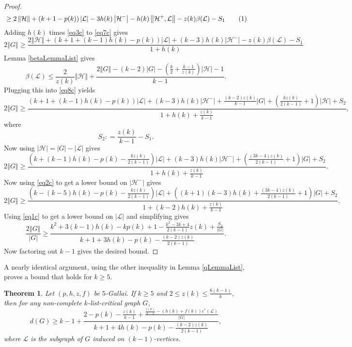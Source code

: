 \documentclass[10pt]{article}
\theoremstyle{plain}
\newtheorem{thm}{Theorem}[section]
\theoremstyle{definition}
\theoremstyle{remark}
\newcommand{\fancy}[1]{\mathcal{#1}}
\renewcommand{\L}{\fancy{L}}
\newcommand{\HH}{\fancy{H}}
\newcommand{\card}[1]{\left|#1\right|}
\newcommand{\size}[1]{\left\Vert#1\right\Vert}
\newcommand{\parens}[1]{\left( #1 \right)}
\newcommand{\DefinedAs}{\mathrel{\mathop:}=}
\newcommand\numberthis{\addtocounter{equation}{1}\tag{\theequation}}
\begin{document}
\begin{proof}
\begin{align*}
	&\ge 2\size{\HH} + \parens{k+1 - p(k)}\card{\L} - 3h(k)\card{\HH^-} - h(k)\size{\HH^+, \L} - z(k)\beta(\L) - S_1\numberthis \label{eq7c}\\
\end{align*}
Adding $h(k)$ times \eqref{eq3c} to \eqref{eq7c} gives
\begin{equation}\label{eq8c}
2\size{G} \ge \frac{2\size{\HH} + \parens{k+1 +(k-1)h(k)- p(k)}\card{\L} + (k- 3)h(k)\card{\HH^-}  - z(k)\beta(\L) - S_1}{1 + h(k)}
\end{equation}
Lemma \ref{betaLemmaList} gives
\[\beta(\L) \le \frac{2}{z(k)}\size{\HH} + \frac{2\size{G} - (k-2)\card{G} - \parens{\frac{k}{2} + \frac{k-1}{z(k)}}\card{\HH} - 1}{k-1}.\]
Plugging this into \eqref{eq8c} yields
\begin{equation}\label{eq9c}
2\size{G} \ge \frac{\parens{k+1 +(k-1)h(k)- p(k)}\card{\L} + (k- 3)h(k)\card{\HH^-} +\frac{(k-2)z(k)}{k-1}\card{G} + \parens{\frac{kz(k)}{2(k-1)} + 1}\card{\HH} + S_2}{1 + h(k) + \frac{z(k)}{k-1}},
\end{equation}
where
\[S_2 \DefinedAs \frac{z(k)}{k-1} - S_1.\]
Now using $\card{\HH} = \card{G} - \card{\L}$ gives
\begin{equation}\label{eq10c}
2\size{G} \ge \frac{\parens{k +(k-1)h(k)- p(k) - \frac{kz(k)}{2(k-1)}}\card{\L} + (k- 3)h(k)\card{\HH^-} + \parens{\frac{(3k-4)z(k)}{2(k-1)} + 1}\card{G} + S_2}{1 + h(k) + \frac{z(k)}{k-1}}.
\end{equation}
Now using \eqref{eq2c} to get a lower bound on $\card{\HH^-}$ gives
\begin{equation}\label{eq11c}
2\size{G} \ge \frac{\parens{k - (k-5)h(k)- p(k) - \frac{kz(k)}{2(k-1)}}\card{\L}+\parens{(k+1)(k-3)h(k) + \frac{(3k-4)z(k)}{2(k-1)} + 1}\card{G} + S_2}{1 + (k-2)h(k) + \frac{z(k)}{k-1}}.
\end{equation}
Using \eqref{eq1c} to get a lower bound on $\card{\L}$ and simplifying gives
\begin{equation}\label{eq12c}
\frac{2\size{G}}{\card{G}} \ge \frac{k^2 + 3(k-1)h(k) - kp(k) + 1 - \frac{k^2-3k+4}{2(k-1)}z(k) + \frac{S_2}{\card{G}}}{k+1 + 3h(k) - p(k) - \frac{(k-2)z(k)}{2(k-1)}}.
\end{equation}
Now factoring out $k-1$ gives the desired bound.
\end{proof}

\noindent A nearly identical argument, using the other inequality in Lemma \ref{qLemmaList}, proves a bound that holds for $k \ge 5$.

\begin{thm}\label{k5}
	Let $\parens{p,h,z,f}$ be $5$-Gallai.  If $k \ge 5$ and $2 \le z(k) \le \frac{6(k-1)}{k}$, then for any non-complete $k$-list-critical graph $G$,
	\[d(G) \ge k-1 + \frac{2 - p(k) - \frac{z(k)}{k-1} + \frac{\frac{z(k)}{k-1} - (h(k) + f(k))c^*(\L)}{\card{G}}}{k+1 + 4h(k) - p(k) - \frac{(k-2)z(k)}{2(k-1)}},\]
	where $\L$ is the subgraph of $G$ induced on $(k-1)$-vertices.
\end{thm}
\end{document}
